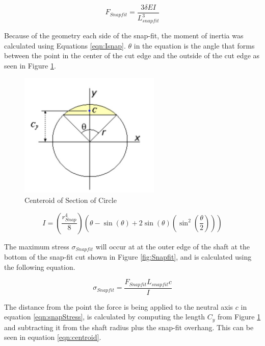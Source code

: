 \documentclass[../main.tex]{subfiles}
\begin{document}
\begin{equation}
\label{eqn:Fsnap}
F_{Snapfit} = \frac{3 \delta E I}{L_{snapfit}^3}
\end{equation}

Because of the geometry each side of the snap-fit, the moment of inertia was calculated using Equations \ref{eqn:Isnap}. $\theta$ in the equation is the angle that forms between the point in the center of the cut edge and the outside of the cut edge as seen in Figure \ref{fig:circleSection}.
\begin{figure}[H]
	\centering
	\includegraphics[width=0.6\textwidth]{img/Gondola/circleSectionGeometry.jpg}
	\caption{Centeroid of Section of Circle \cite{circlesection}}
	\label{fig:circleSection}
\end{figure}

\begin{equation}
\label{eqn:Isnap}
I = \left(\frac{r_{Snap}^4}{8}\right)  \left(\theta -\sin(\theta)+2\sin(\theta)(\sin^2\left(\frac{\theta}{2}\right))\right)
\end{equation}

The maximum stress $\sigma_{Snapfit}$ will occur at at the outer edge of the shaft at the bottom of the snap-fit cut shown in Figure \ref{fig:Snapfit}, and is calculated using the following equation.

\begin{equation}
\label{eqn:snapStress}
\sigma_{Snapfit} = \frac{F_{Snapfit} L_{snapfit} c}{I}
\end{equation}

The distance from the point the force is being applied to the neutral axis $c$ in equation \ref{eqn:snapStress}, is calculated by computing the length $C_y$ from Figure \ref{fig:circleSection} and subtracting it from the shaft radius plus the snap-fit overhang. This can be seen in equation \ref{eqn:centroid}. 
\end{document}
